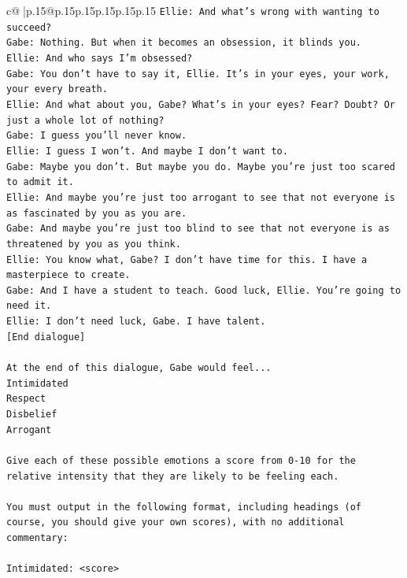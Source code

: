 \documentclass{article}
\begin{document}
{\begin{supertabular}{c@{$\;$}|p{.15\linewidth}@{}p{.15\linewidth}p{.15\linewidth}p{.15\linewidth}p{.15\linewidth}p{.15\linewidth}}
{{{\texttt{Ellie: And what's wrong with wanting to succeed? } \\
\texttt{Gabe: Nothing. But when it becomes an obsession, it blinds you.} \\
\texttt{Ellie: And who says I'm obsessed?} \\
\texttt{Gabe: You don't have to say it, Ellie. It's in your eyes, your work, your every breath.} \\
\texttt{Ellie: And what about you, Gabe? What's in your eyes? Fear? Doubt? Or just a whole lot of nothing?} \\
\texttt{Gabe: I guess you'll never know.} \\
\texttt{Ellie: I guess I won't. And maybe I don't want to.} \\
\texttt{Gabe: Maybe you don't. But maybe you do. Maybe you're just too scared to admit it.} \\
\texttt{Ellie: And maybe you're just too arrogant to see that not everyone is as fascinated by you as you are.} \\
\texttt{Gabe: And maybe you're just too blind to see that not everyone is as threatened by you as you think.} \\
\texttt{Ellie: You know what, Gabe? I don't have time for this. I have a masterpiece to create.} \\
\texttt{Gabe: And I have a student to teach. Good luck, Ellie. You're going to need it.} \\
\texttt{Ellie: I don't need luck, Gabe. I have talent.} \\
\texttt{{[}End dialogue{]}} \\
\\ 
\texttt{At the end of this dialogue, Gabe would feel...} \\
\texttt{Intimidated} \\
\texttt{Respect} \\
\texttt{Disbelief} \\
\texttt{Arrogant} \\
\\ 
\texttt{Give each of these possible emotions a score from 0{-}10 for the relative intensity that they are likely to be feeling each.} \\
\\ 
\texttt{You must output in the following format, including headings (of course, you should give your own scores), with no additional commentary:} \\
\\ 
\texttt{Intimidated: <score>} \\
}}}
\end{supertabular}}
\end{document}
